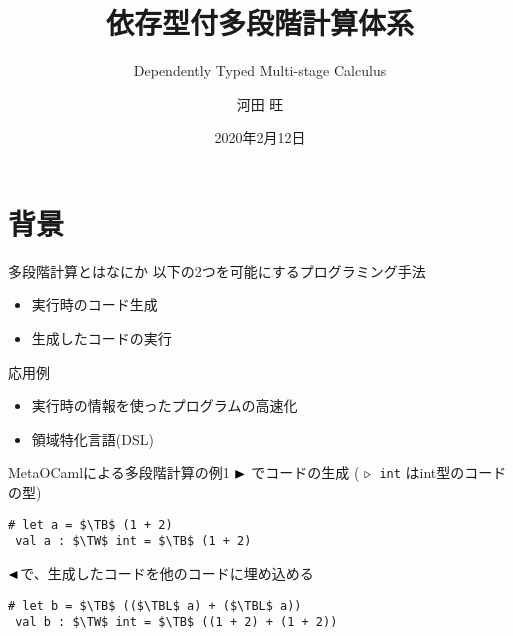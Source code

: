\documentclass[dvipdfmx,aspectratio=169, 20pt]{beamer}
\title{依存型付多段階計算体系}
\subtitle{Dependently Typed Multi-stage Calculus}
\author{河田 旺}
\institute{五十嵐・末永研究室}
\date{2020年2月12日}
\begin{document}
\maketitle



\section{背景}

%
%

\begin{frame}[fragile]{多段階計算とはなにか}
    以下の2つを可能にするプログラミング手法
    \begin{itemize}
        \item 実行時のコード生成
        \item 生成したコードの実行
    \end{itemize}
    応用例
    \begin{itemize}
        \item 実行時の情報を使ったプログラムの高速化
        \item 領域特化言語(DSL)
    \end{itemize}
\end{frame}

\begin{frame}[fragile]{MetaOCamlによる多段階計算の例1}
    \( {\mathop{\blacktriangleright}} \) でコードの生成 ( \( {\mathop{\triangleright}} \)\ \verb|int| はint型のコードの型)
    \begin{exampleblock}{}
        \begin{Verbatim}[commandchars=\\\{\},codes={\catcode`$=3\catcode`^=7}]
 # let a = $\TB$ (1 + 2)
 val a : $\TW$ int = $\TB$ (1 + 2)
        \end{Verbatim}
    \end{exampleblock}
    \( {\mathop{\blacktriangleleft}} \)で、生成したコードを他のコードに埋め込める
    \begin{exampleblock}{}
        \begin{Verbatim}[commandchars=\\\{\},codes={\catcode`$=3\catcode`^=7}]
 # let b = $\TB$ (($\TBL$ a) + ($\TBL$ a))
 val b : $\TW$ int = $\TB$ ((1 + 2) + (1 + 2))
        \end{Verbatim}
    \end{exampleblock}
\end{frame}
\end{document}
